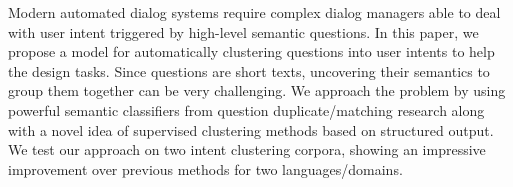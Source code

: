 Modern automated dialog systems require complex dialog managers able to deal with user intent triggered by high-level semantic questions. In this paper, we propose a model for automatically clustering questions into user intents to help the design tasks. Since questions are short texts, uncovering their semantics to group them together can be very challenging. We approach the problem by using powerful semantic classifiers from question duplicate/matching research along with a novel idea of  supervised clustering methods based on structured output. We test our approach on two intent clustering corpora, showing an impressive improvement over previous methods for two languages/domains.
